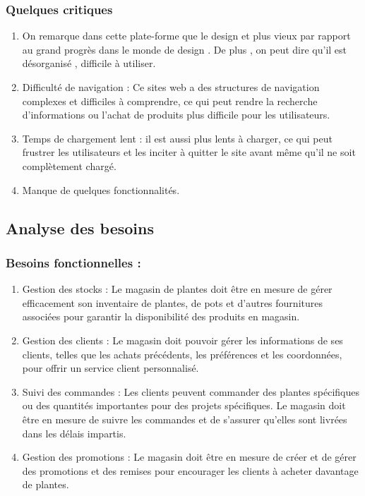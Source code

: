 \documentclass[a4paper,12pt,oneside]{article}
\begin{document}
\newpage

\subsubsection{Quelques critiques }
\begin{enumerate}
  \item On remarque dans cette plate-forme que le
design et plus vieux par rapport au grand
progrès dans le monde de design . De plus , on
peut dire qu'il est désorganisé , difficile à
utiliser.
  \item Difficulté de navigation : Ce sites web a des
structures de navigation complexes et difficiles
à comprendre, ce qui peut rendre la recherche
d'informations ou l'achat de produits plus
difficile pour les utilisateurs.
  \item Temps de chargement lent : il est aussi plus
lents à charger, ce qui peut frustrer les
utilisateurs et les inciter à quitter le site avant
même qu'il ne soit complètement chargé.
\item Manque de quelques fonctionnalités.
\end{enumerate}


\subsection{Analyse des besoins }
\subsubsection{Besoins fonctionnelles :}
\begin{enumerate}
  \item Gestion des stocks : Le magasin de plantes
doit être en mesure de gérer efficacement
son inventaire de plantes, de pots et d'autres
fournitures associées pour garantir la
disponibilité des produits en magasin.
  \item Gestion des clients : Le magasin doit pouvoir
gérer les informations de ses clients, telles
que les achats précédents, les préférences et
les coordonnées, pour offrir un service client
personnalisé.
  \item Suivi des commandes : Les clients peuvent
commander des plantes spécifiques ou des
quantités importantes pour des projets
spécifiques. Le magasin doit être en mesure de suivre les commandes et de s'assurer qu'elles
sont livrées dans les délais impartis.
\item Gestion des promotions : Le magasin doit être
en mesure de créer et de gérer des promotions et
des remises pour encourager les clients à acheter
davantage de plantes.
\end{enumerate}
\end{document}
